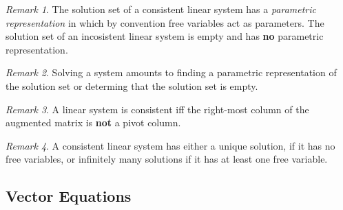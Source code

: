 \documentclass{article}
\theoremstyle{definition}
\theoremstyle{remark}
\newtheorem*{remark}{Remark}
\theoremstyle{remark}
\theoremstyle{remark}
\newtheorem*{it follows}{It follows}
\begin{document}
\begin{remark}
  The solution set of a consistent linear system has a \textit{parametric representation} in which by convention free variables act as parameters. The solution set of an incosistent linear system is empty and has \textbf{no} parametric representation.
\end{remark}

\begin{remark}
  Solving a system amounts to finding a parametric representation of the solution set or determing that the solution set is empty.
\end{remark}

\begin{remark}
  A linear system is consistent iff the right-most column of the augmented matrix is \textbf{not} a pivot column.
\end{remark}

\begin{remark}
  A consistent linear system has either a unique solution, if it has no free variables, or infinitely many solutions if it has at least one free variable.
\end{remark}

\subsection{Vector Equations}
\end{document}
